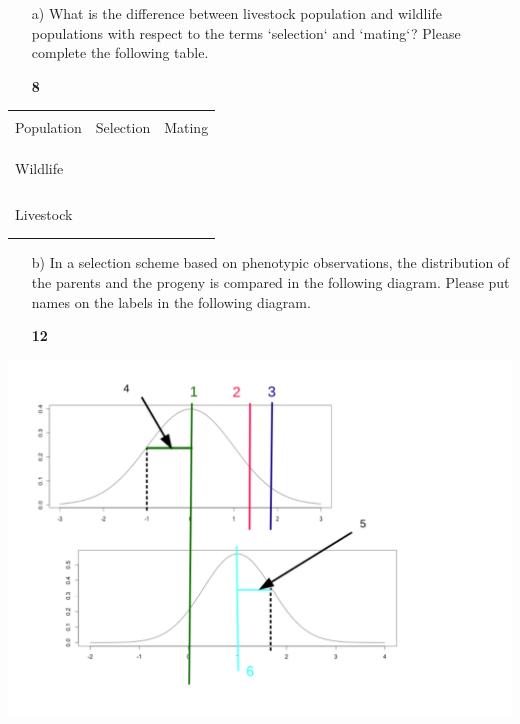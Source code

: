 \documentclass[]{article}
\newcommand{\points}[1]
{\begin{flushright}\textbf{#1}\end{flushright}}
\begin{document}
\begin{enumerate}
\item[a)] What is the difference between livestock population and wildlife populations with respect to the terms `selection` and `mating`? Please complete the following table.
\points{8}
\end{enumerate}

\vspace{3ex}

\begin{center}
\begin{tabular}{p{2cm}|p{5.5cm}|p{5.5cm}}
\hline
& & \\
Population & Selection & Mating \\
& & \\
\hline
& & \\
& & \\
Wildlife &  &  \\ 
& & \\
& & \\
\hline
& & \\
& & \\
Livestock &  &  \\ 
& & \\
& & \\
\hline
\end{tabular}
\end{center}

\clearpage
\pagebreak

\begin{enumerate}
\item[b)] In a selection scheme based on phenotypic observations, the distribution of the parents and the progeny is compared in the following diagram. Please put names on the labels in the following diagram.
\points{12}
\end{enumerate}

\begin{center}\includegraphics{png/GerichteteSelektionElternNk} \end{center}
\end{document}
